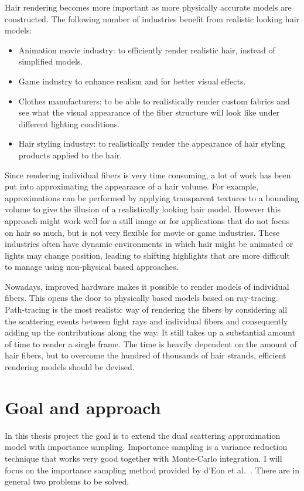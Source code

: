 \documentclass[11pt,a4paper]{report}
\begin{document}
Hair rendering becomes more important as more physically accurate models are constructed. The following number of industries benefit from realistic looking hair models:

\begin{itemize}
\item Animation movie industry: to efficiently render realistic hair, instead of simplified models.
\item Game industry to enhance realism and for better visual effects.
\item Clothes manufacturers: to be able to realistically render custom fabrics and see what the visual appearance of the fiber structure will look like under different lighting conditions.
\item Hair styling industry: to realistically render the appearance of hair styling products applied to the hair.
\end{itemize}

Since rendering individual fibers is very time consuming, a lot of work has been put into approximating the appearance of a hair volume. For example, approximations can be performed by applying transparent textures to a bounding volume to give the illusion of a realistically looking hair model. However this approach might work well for a still image or for applications that do not focus on hair so much, but is not very flexible for movie or game industries. These industries often have dynamic environments in which hair might be animated or lights may change position, leading to shifting highlights that are more difficult to manage using non-physical based approaches.

Nowadays, improved hardware makes it possible to render models of individual fibers. This opens the door to physically based models based on ray-tracing. Path-tracing is the most realistic way of rendering the fibers by considering all the scattering events between light rays and individual fibers and consequently adding up the contributions along the way. It still takes up a substantial amount of time to render a single frame. The time is heavily dependent on the amount of hair fibers, but to overcome the hundred of thousands of hair strands, efficient rendering models should be devised.


\section{Goal and approach}
In this thesis project the goal is to extend the dual scattering approximation model with importance sampling. Importance sampling is a variance reduction technique that works very good together with Monte-Carlo integration. I will focus on the importance sampling method provided by d'Eon et al.~\cite{eon2013}. There are in general two problems to be solved.
\end{document}
